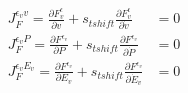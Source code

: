 \begin{align}
    J_F^{\epsilon_{v} v} = \frac{\partial F^\epsilon_{v}}{\partial v} + s_{tshift} \frac{\partial F^\epsilon_{v}}{\partial \dot{v}}                            & = 0                                                                                                                                              \\
    J_F^{\epsilon_{v} P} = \frac{\partial F^{\epsilon_{v}}}{\partial P} + s_{tshift} \frac{\partial F^{\epsilon_{v}}}{\partial \dot{P}}                        & = 0                                                                                                                                              \\
    J_F^{\epsilon_{v} E_{v}} = \frac{\partial F^{\epsilon_{v}}}{\partial E_{v}} + s_{tshift} \frac{\partial F^{\epsilon_{v}}}{\partial \dot{E}_{v}}            & = 0
\end{align}

